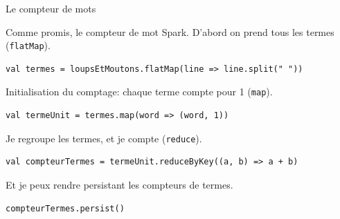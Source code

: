 \begin{frame}[fragile]{Le compteur de mots}

Comme promis, le compteur de mot Spark. D'abord on prend tous les termes
(\texttt{flatMap}).


\begin{verbatim}
val termes = loupsEtMoutons.flatMap(line => line.split(" "))
\end{verbatim}

\vfill

Initialisation du comptage: chaque terme compte pour 1 (\texttt{map}).


\begin{verbatim}
val termeUnit = termes.map(word => (word, 1))
\end{verbatim}

\vfill

Je regroupe les termes, et je compte (\texttt{reduce}).


\begin{verbatim}
val compteurTermes = termeUnit.reduceByKey((a, b) => a + b)
\end{verbatim}

\vfill

Et je peux rendre \alert{persistant} les compteurs de termes.


\begin{verbatim}
compteurTermes.persist()
\end{verbatim}



\end{frame}